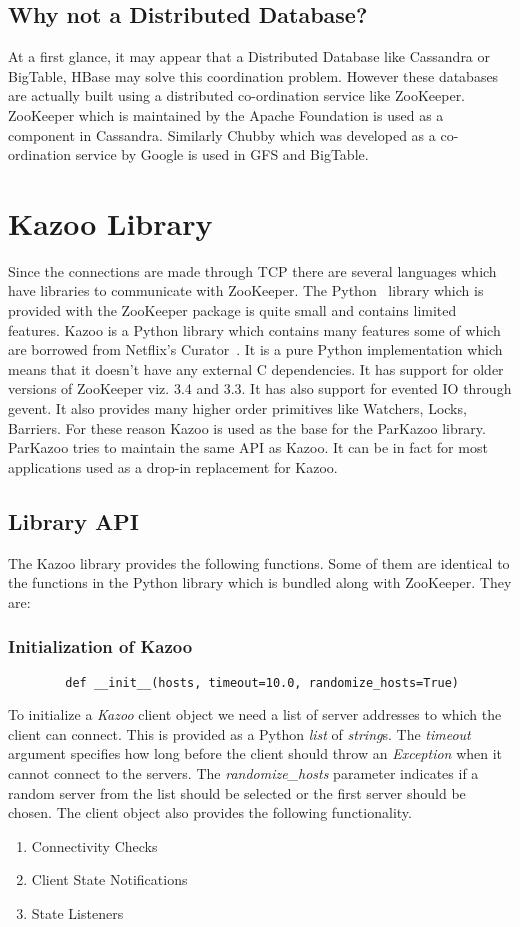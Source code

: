 \subsection{Why not a Distributed Database?}
At a first glance, it may appear that a Distributed Database like Cassandra or BigTable, HBase may solve this coordination problem. However these databases are actually built using a distributed co-ordination service like ZooKeeper. ZooKeeper which is maintained by the Apache Foundation is used as a component in Cassandra. Similarly Chubby which was developed as a co-ordination service by Google is used in GFS and BigTable.

\section{Kazoo Library}
Since the connections are made through TCP there are several languages which have libraries to communicate with ZooKeeper. The Python~\cite{van2002python} library which is provided with the ZooKeeper package is quite small and contains limited features. Kazoo is a Python library which contains many features some of which are borrowed from Netflix's Curator~\cite{apachecurator2015}. It is a pure Python implementation which means that it doesn't have any external C dependencies. It has support for older versions of ZooKeeper viz. 3.4 and 3.3. It has also support for evented IO through gevent. It also provides many higher order primitives like Watchers, Locks, Barriers. For these reason Kazoo is used as the base for the ParKazoo library. ParKazoo tries to maintain the same API as Kazoo. It can be in fact for most applications used as a drop-in replacement for Kazoo.

\subsection{Library API}
The Kazoo library provides the following functions. Some of them are identical to the functions in the Python library which is bundled along with ZooKeeper. They are:
  \subsubsection{Initialization of Kazoo}
  	\begin{lstlisting}
  		def __init__(hosts, timeout=10.0, randomize_hosts=True)
  	\end{lstlisting}
  	To initialize a \textit{Kazoo} client object we need a list of server addresses to which the client can connect. This is provided as a Python \textit{list} of \textit{string}s. The \textit{timeout} argument specifies how long before the client should throw an \textit{Exception} when it cannot connect to the servers. The \textit{randomize\_hosts} parameter indicates if a random server from the list should be selected or the first server should be chosen.
	The client object also provides the following functionality.
	\begin{enumerate}
		\item Connectivity Checks
		\item Client State Notifications
		\item State Listeners
	\end{enumerate}

